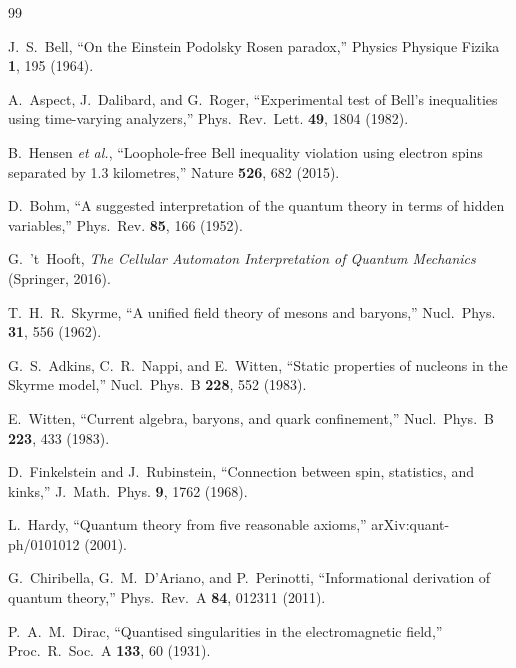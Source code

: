 ﻿\documentclass[11pt,a4paper]{article}
\begin{document}
\begin{thebibliography}{99}

 J.~S.~Bell, ``On the Einstein Podolsky Rosen paradox,'' Physics Physique Fizika \textbf{1}, 195 (1964).

 A.~Aspect, J.~Dalibard, and G.~Roger, ``Experimental test of Bell's inequalities using time-varying analyzers,'' Phys.\ Rev.\ Lett. \textbf{49}, 1804 (1982).

 B.~Hensen \emph{et al.}, ``Loophole-free Bell inequality violation using electron spins separated by 1.3 kilometres,'' Nature \textbf{526}, 682 (2015).

 D.~Bohm, ``A suggested interpretation of the quantum theory in terms of hidden variables,'' Phys.\ Rev. \textbf{85}, 166 (1952).

 G.~'t~Hooft, \emph{The Cellular Automaton Interpretation of Quantum Mechanics} (Springer, 2016).

 T.~H.~R.~Skyrme, ``A unified field theory of mesons and baryons,'' Nucl.\ Phys. \textbf{31}, 556 (1962).

 G.~S.~Adkins, C.~R.~Nappi, and E.~Witten, ``Static properties of nucleons in the Skyrme model,'' Nucl.\ Phys.\ B \textbf{228}, 552 (1983).

 E.~Witten, ``Current algebra, baryons, and quark confinement,'' Nucl.\ Phys.\ B \textbf{223}, 433 (1983).

 D.~Finkelstein and J.~Rubinstein, ``Connection between spin, statistics, and kinks,'' J.\ Math.\ Phys. \textbf{9}, 1762 (1968).

 L.~Hardy, ``Quantum theory from five reasonable axioms,'' arXiv:quant-ph/0101012 (2001).

 G.~Chiribella, G.~M.~D'Ariano, and P.~Perinotti, ``Informational derivation of quantum theory,'' Phys.\ Rev.\ A \textbf{84}, 012311 (2011).

 P.~A.~M.~Dirac, ``Quantised singularities in the electromagnetic field,'' Proc.\ R.\ Soc.\ A \textbf{133}, 60 (1931).

\end{thebibliography}
\end{document}
